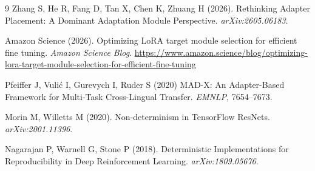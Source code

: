 \documentclass[11pt]{article}
\begin{document}
\begin{thebibliography}{9}
Zhang S, He R, Fang D, Tan X, Chen K, Zhuang H (2026).
Rethinking Adapter Placement: A Dominant Adaptation Module Perspective.
\emph{arXiv:2605.06183}.

Amazon Science (2026).
Optimizing LoRA target module selection for efficient fine tuning.
\emph{Amazon Science Blog}.
\url{https://www.amazon.science/blog/optimizing-lora-target-module-selection-for-efficient-fine-tuning}

Pfeiffer J, Vuli\'c I, Gurevych I, Ruder S (2020) MAD-X: An Adapter-Based
Framework for Multi-Task Cross-Lingual Transfer. \emph{EMNLP}, 7654--7673.

Morin M, Willetts M (2020).
Non-determinism in TensorFlow ResNets.
\emph{arXiv:2001.11396}.

Nagarajan P, Warnell G, Stone P (2018).
Deterministic Implementations for Reproducibility in Deep Reinforcement
Learning.
\emph{arXiv:1809.05676}.

\end{thebibliography}
\end{document}
